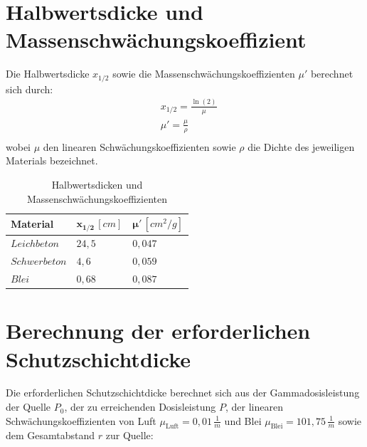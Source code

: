 \documentclass[12pt,german]{article}
\begin{document}
    \section{Halbwertsdicke und Massenschwächungskoeffizient}
    Die Halbwertsdicke $ x_{1/2} $ sowie die Massenschwächungskoeffizienten $\mu'$ berechnet sich durch:
    \begin{align*}
        &x_{1/2} = \frac{\ln(2)}{\mu} \\
        &\mu' = \frac{\mu}{\rho} \\
    \end{align*}
    wobei $\mu$ den linearen Schwächungskoeffizienten sowie $\rho$ die Dichte des jeweiligen Materials bezeichnet. \\
    \begin{table}[H]
        \centering
        \begin{tabularx}{\textwidth}{X|X|X}
            \toprule
            \textbf{Material} & \( \mathbf{x_{1/2}} \, [cm]\) & \( \mathbf{\mu'} \, [{cm}^2/g] \) \\
            \midrule
            $ Leichbeton $ & $ 24,5 $ & $ 0,047 $ \\
            $ Schwerbeton $ & $ 4,6 $ & $ 0,059 $ \\
            $ Blei $ & $ 0,68 $ & $ 0,087 $ \\
            \bottomrule
        \end{tabularx}
        \caption{Halbwertsdicken und Massenschwächungskoeffizienten}
    \end{table}
    
    \newpage
    \section{Berechnung der erforderlichen Schutzschichtdicke}
    Die erforderlichen Schutzschichtdicke berechnet sich aus der Gammadosisleistung der Quelle \(P_0\), der zu erreichenden Dosisleistung \(P\), 
    der linearen Schwächungskoeffizienten von Luft \(\mu_{\text{Luft}} = 0,01\, \frac{1}{m}\) und Blei \(\mu_{\text{Blei}} =101,75\, \frac{1}{m}\) sowie dem Gesamtabstand \(r\) zur Quelle:
    
\end{document}
